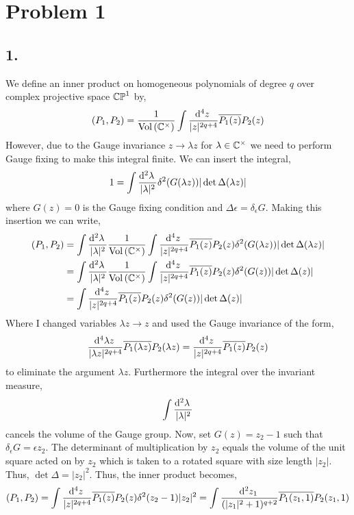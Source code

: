 \documentclass[12pt]{article}
\begin{document}

\section*{Problem 1}

\subsection*{1.}

We define an inner product on homogeneous polynomials of degree $q$ over complex projective space $\mathbb{CP}^{1}$ by,
\[ (P_1, P_2) = \frac{1}{\mathrm{Vol}\left(\mathbb{C}^\times\right)} \int \frac{\mathrm{d}^{4} z \:}{|z|^{2q + 4}} \overline{P_1(z)} P_2(z) \]
However, due to the Gauge invariance $z \to \lambda z$ for $\lambda \in \mathbb{C}^\times$ we need to perform Gauge fixing to make this integral finite. We can insert the integral,
\[ 1 = \int \frac{\mathrm{d}^{2} \lambda \:}{|\lambda|^2} \delta^2(G(\lambda z)) |\det{\Delta(\lambda z)} |  \]
where $G(z) = 0$ is the Gauge fixing condition and $\Delta \epsilon = \delta_{\epsilon} G$. Making this insertion we can write, 
\begin{align*}
(P_1, P_2) & =  \int \frac{\mathrm{d}^{2} \lambda \:}{|\lambda|^2} \frac{1}{\mathrm{Vol}\left(\mathbb{C}^\times\right)}  \int \frac{\mathrm{d}^{4} z \:}{|z|^{2q + 4}} \overline{P_1(z)} P_2(z) \delta^2(G(\lambda z)) |\det{\Delta(\lambda z)} | 
\\
& = \int \frac{\mathrm{d}^{2} \lambda \:}{|\lambda|^2} \frac{1}{\mathrm{Vol}\left(\mathbb{C}^\times\right)} \int \frac{\mathrm{d}^{4} z \:}{|z|^{2q + 4}} \overline{P_1(z)} P_2(z) \delta^2(G(z)) |\det{\Delta(z)} | 
\\
& = \int \frac{\mathrm{d}^{4} z \:}{|z|^{2q + 4}} \overline{P_1(z)} P_2(z) \delta^2(G(z)) |\det{\Delta(z)} | 
\end{align*} 
Where I changed variables $\lambda z \to z$ and used the Gauge invariance of the form,
\[ \frac{\mathrm{d}^{4} \lambda z \:}{|\lambda z|^{2q + 4}} \overline{P_1(\lambda z)} P_2(\lambda z) = \frac{\mathrm{d}^{4} z \:}{|z|^{2q + 4}} \overline{P_1(z)} P_2(z) \]
to eliminate the argument $\lambda z$. Furthermore the integral over the invariant measure,
\[ \int \frac{\mathrm{d}^{2} \lambda \:}{|\lambda|^2} \]
cancels the volume of the Gauge group. Now, set $G(z) = z_2 - 1$ such that $\delta_{\epsilon} G = \epsilon z_2$. The determinant of multiplication by $z_2$ equals the volume of the unit square acted on by $z_2$ which is taken to a rotated square with size length $|z_2|$. Thus, $\det{\Delta} = |z_2|^2$. Thus, the inner product becomes,   
\[ (P_1, P_2) =  \int \frac{\mathrm{d}^{4} z \:}{|z|^{2q + 4}} \overline{P_1(z)} P_2(z) \delta^2(z_2 - 1) |z_2|^2  = \int \frac{\mathrm{d}^{2} z_1 \:}{(|z_1|^2 + 1)^{q + 2}} \overline{P_1(z_1, 1)} P_2(z_1, 1) \]
\end{document}
